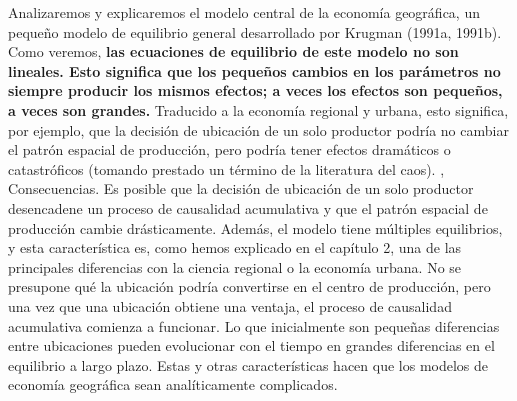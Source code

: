 Analizaremos y explicaremos el modelo central de la economía geográfica, un pequeño modelo de equilibrio general desarrollado por Krugman (1991a, 1991b). Como veremos, \textbf{las ecuaciones de equilibrio de este modelo no son lineales. Esto significa que los pequeños cambios en los parámetros no siempre producir los mismos efectos; a veces los efectos son pequeños, a veces son grandes.} Traducido a la economía regional y urbana, esto significa, por ejemplo, que la decisión de ubicación de un solo productor podría no cambiar el patrón espacial de producción, pero podría tener efectos dramáticos o catastróficos (tomando prestado un término de la literatura del caos). , Consecuencias. Es posible que la decisión de ubicación de un solo productor desencadene un proceso de causalidad acumulativa y que el patrón espacial de producción cambie drásticamente. Además, el modelo tiene múltiples equilibrios, y esta característica es, como hemos explicado en el capítulo 2, una de las principales diferencias con la ciencia regional o la economía urbana. No se presupone qué la ubicación podría convertirse en el centro de producción, pero una vez que una ubicación obtiene una ventaja, el proceso de causalidad acumulativa comienza a funcionar. Lo que inicialmente son pequeñas diferencias entre ubicaciones pueden evolucionar con el tiempo en grandes diferencias en el equilibrio a largo plazo. Estas y otras características hacen que los modelos de economía geográfica sean analíticamente complicados.\\

